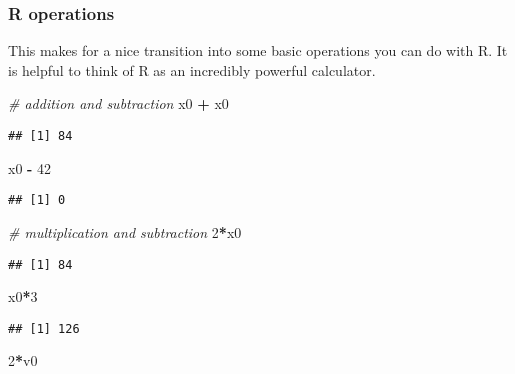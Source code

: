 \documentclass[]{article}
\newenvironment{Shaded}{\begin{snugshade}}{\end{snugshade}}
\newcommand{\CommentTok}[1]{\textcolor[rgb]{0.56,0.35,0.01}{\textit{#1}}}
\newcommand{\DecValTok}[1]{\textcolor[rgb]{0.00,0.00,0.81}{#1}}
\newcommand{\NormalTok}[1]{#1}
\newcommand{\OperatorTok}[1]{\textcolor[rgb]{0.81,0.36,0.00}{\textbf{#1}}}
\newcommand{\StringTok}[1]{\textcolor[rgb]{0.31,0.60,0.02}{#1}}
\begin{document}
\hypertarget{r-operations}{%
\subsubsection{R operations}\label{r-operations}}

This makes for a nice transition into some basic operations you can do
with R. It is helpful to think of R as an incredibly powerful
calculator.

\begin{Shaded}
\begin{Highlighting}[]
\CommentTok{# addition and subtraction }
\NormalTok{x0 }\OperatorTok{+}\StringTok{ }\NormalTok{x0}
\end{Highlighting}
\end{Shaded}

\begin{verbatim}
## [1] 84
\end{verbatim}

\begin{Shaded}
\begin{Highlighting}[]
\NormalTok{x0 }\OperatorTok{-}\StringTok{ }\DecValTok{42}
\end{Highlighting}
\end{Shaded}

\begin{verbatim}
## [1] 0
\end{verbatim}

\begin{Shaded}
\begin{Highlighting}[]
\CommentTok{# multiplication and subtraction }
\DecValTok{2}\OperatorTok{*}\NormalTok{x0}
\end{Highlighting}
\end{Shaded}

\begin{verbatim}
## [1] 84
\end{verbatim}

\begin{Shaded}
\begin{Highlighting}[]
\NormalTok{x0}\OperatorTok{*}\DecValTok{3} 
\end{Highlighting}
\end{Shaded}

\begin{verbatim}
## [1] 126
\end{verbatim}

\begin{Shaded}
\begin{Highlighting}[]
\DecValTok{2}\OperatorTok{*}\NormalTok{v0}
\end{Highlighting}
\end{Shaded}
\end{document}
